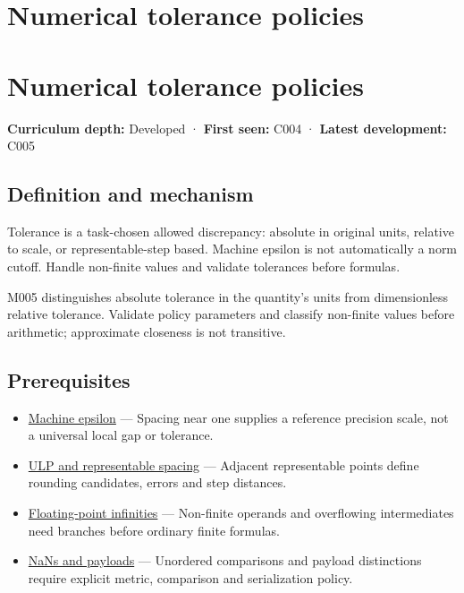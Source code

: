 \hypertarget{appendix-0ec599f8ba27}{}
\section*{Numerical tolerance policies}
\section{Numerical tolerance policies}\label{numerical-tolerance-policies}

\textbf{Curriculum depth:} Developed · \textbf{First seen:} C004 · \textbf{Latest development:} C005

\subsection{Definition and mechanism}\label{definition-and-mechanism}

Tolerance is a task-chosen allowed discrepancy: absolute in original units, relative to scale, or representable-step based. Machine epsilon is not automatically a norm cutoff. Handle non-finite values and validate tolerances before formulas.

M005 distinguishes absolute tolerance in the quantity's units from dimensionless relative tolerance. Validate policy parameters and classify non-finite values before arithmetic; approximate closeness is not transitive.

\subsection{Prerequisites}\label{prerequisites}

\begin{itemize}
\tightlist
\item
  \hyperref[appendix-390ea641da54]{Machine epsilon} --- Spacing near one supplies a reference precision scale, not a universal local gap or tolerance.
\item
  \hyperref[appendix-14bab4cab9d4]{ULP and representable spacing} --- Adjacent representable points define rounding candidates, errors and step distances.
\item
  \hyperref[appendix-eb336149c00a]{Floating-point infinities} --- Non-finite operands and overflowing intermediates need branches before ordinary finite formulas.
\item
  \hyperref[appendix-d6607cc4c235]{NaNs and payloads} --- Unordered comparisons and payload distinctions require explicit metric, comparison and serialization policy.
\end{itemize}

